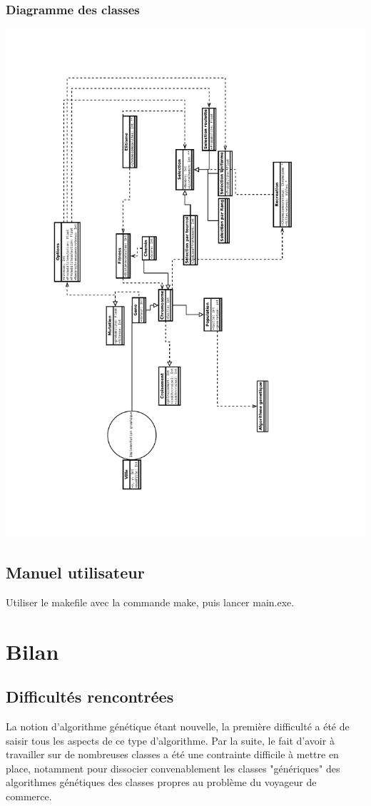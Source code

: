 \documentclass{report}
\begin{document}
\subsection{Diagramme des classes}
	\includegraphics[scale=0.6, angle=270]{../Classes_UML.pdf}
\section{Manuel utilisateur}
Utiliser le makefile avec la commande make, puis lancer main.exe.
\chapter{Bilan}
\section{Difficultés rencontrées}
La notion d'algorithme génétique étant nouvelle, la première difficulté a été de saisir tous les aspects de ce type d'algorithme. Par la suite, le fait d'avoir à travailler sur de nombreuses classes a été une contrainte difficile à mettre en place, notamment pour dissocier convenablement les classes "génériques" des algorithmes génétiques des classes propres au problème du voyageur de commerce.
\end{document}
